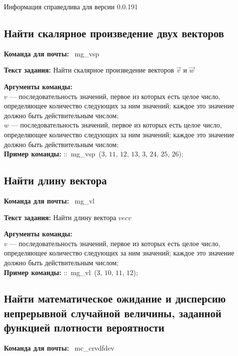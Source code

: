 Информация справедлива для версии 0.0.191

\subsection{Найти скалярное произведение двух векторов}

\noindent \textbf{Команда для почты:} \mbox{ mg\_vsp }

\noindent \textbf{Текст задания:} Найти скалярное произведение векторов $\vec{v}$ и $\vec{w}$

\noindent \textbf{Аргументы команды:}\\ $v$ --- последовательность значений, первое из которых есть целое число, определяющее количество следующих за ним значений; каждое это  значение должно быть действительным числом;\\
$w$ --- последовательность значений, первое из которых есть целое число, определяющее количество следующих за ним значений; каждое это  значение должно быть действительным числом;\\
 

\noindent \textbf{Пример команды:} ::\mbox{ mg\_vsp }($3$, $11$, $12$, $13$, $3$, $24$, $25$, $26$);

\subsection{Найти длину вектора}

\noindent \textbf{Команда для почты:} \mbox{ mg\_vl }

\noindent \textbf{Текст задания:} Найти длину вектора $vec{v}$

\noindent \textbf{Аргументы команды:}\\ $v$ --- последовательность значений, первое из которых есть целое число, определяющее количество следующих за ним значений; каждое это  значение должно быть действительным числом;\\
 

\noindent \textbf{Пример команды:} ::\mbox{ mg\_vl }($3$, $10$, $11$, $12$);

\subsection{Найти математическое ожидание и дисперсию непрерывной случайной величины, заданной функцией плотности вероятности}

\noindent \textbf{Команда для почты:} \mbox{ mc\_crvdfdev }

